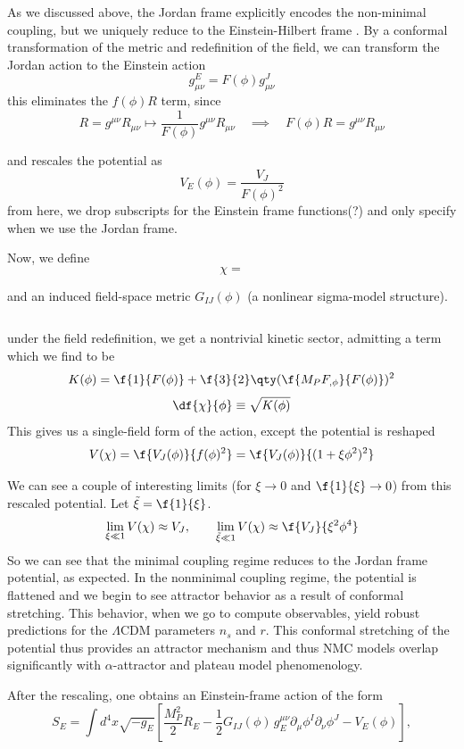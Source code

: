 As we discussed above, the Jordan frame explicitly encodes the non-minimal coupling, but we uniquely reduce to the Einstein-Hilbert frame . By a conformal transformation of the metric and redefinition of the field, we can transform the Jordan action to the Einstein action
\[
g_{\mu\nu}^E=F(\phi)g^J_{\mu\nu}
\]
this eliminates the $f(\phi)R$ term, since
\[
R=g^{\mu\nu}R_{\mu\nu} \mapsto \frac{1}{F(\phi)}g^{\mu\nu}R_{\mu\nu} \quad\implies\quad F(\phi)R=g^{\mu\nu}R_{\mu\nu}
\]

and rescales the potential as
\[
V_E(\phi)=\frac{V_J}{F(\phi)^2}
\]
from here, we drop subscripts for the Einstein frame functions(?) and only specify when we use the Jordan frame.

Now, we define
\[
\chi=
\]

and an induced field-space metric $G_{IJ}(\phi)$ (a nonlinear sigma-model structure).

\[\]

under the field redefinition, we get a nontrivial kinetic sector, admitting a term which we find to be
\[
K(\phi)=\f{1}{F(\phi)}+\f{3}{2}\qty(\f{M_PF_{,\phi}}{F(\phi)})^2
\]
\[
\df{\chi}{\phi}\equiv \sqrt{K(\phi)}
\]
This gives us a single-field form of the action, except the potential is reshaped 
\[
V(\chi)=\f{V_J(\phi)}{f(\phi)^2}=\f{V_J(\phi)}{(1+\xi\phi^2)^2}
\]

We can see a couple of interesting limits (for $\xi\to0$ and $\f{1}{\xi}\to0$) from this rescaled potential.  Let $\tilde{\xi}=\f{1}{\xi}$.
\[
\lim_{\xi \ll 1}V(\chi)\approx V_J, \qquad \lim_{\tilde{\xi} \ll 1}V(\chi)\approx \f{V_J}{\xi^2\phi^4}
\]
So we can see that the minimal coupling regime reduces to the Jordan frame potential, as expected. In the nonminimal coupling regime, the potential is flattened and we begin to see attractor behavior as a result of conformal stretching. This behavior, when we go to compute observables, yield robust predictions for the $\Lambda$CDM parameters $n_s$ and $r$. This conformal stretching of the potential thus provides an attractor mechanism and thus NMC models overlap significantly with $\alpha$-attractor and plateau model phenomenology.




 After the rescaling, one obtains an Einstein-frame action of the form
\begin{equation}
S_E=\int d^4x \sqrt{-g_E}\left[\frac{M_P^2}{2}R_E-\frac{1}{2}G_{IJ}(\phi)\,g_E^{\mu\nu}\partial_\mu\phi^I\partial_\nu\phi^J - V_E(\phi)\right],
\label{eq:EinsteinActionGeneral}
\end{equation}





